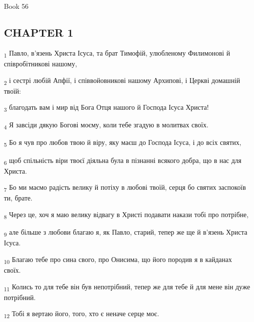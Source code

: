 Book 56
\subsection{CHAPTER 1}
\begin{tcolorbox}
\textsubscript{1} Павло, в'язень Христа Ісуса, та брат Тимофій, улюбленому Филимонові й співробітникові нашому,
\end{tcolorbox}
\begin{tcolorbox}
\textsubscript{2} і сестрі любій Апфії, і співвойовникові нашому Архипові, і Церкві домашній твоїй:
\end{tcolorbox}
\begin{tcolorbox}
\textsubscript{3} благодать вам і мир від Бога Отця нашого й Господа Ісуса Христа!
\end{tcolorbox}
\begin{tcolorbox}
\textsubscript{4} Я завсіди дякую Богові моєму, коли тебе згадую в молитвах своїх.
\end{tcolorbox}
\begin{tcolorbox}
\textsubscript{5} Бо я чув про любов твою й віру, яку маєш до Господа Ісуса, і до всіх святих,
\end{tcolorbox}
\begin{tcolorbox}
\textsubscript{6} щоб спільність віри твоєї діяльна була в пізнанні всякого добра, що в нас для Христа.
\end{tcolorbox}
\begin{tcolorbox}
\textsubscript{7} Бо ми маємо радість велику й потіху в любові твоїй, серця бо святих заспокоїв ти, брате.
\end{tcolorbox}
\begin{tcolorbox}
\textsubscript{8} Через це, хоч я маю велику відвагу в Христі подавати накази тобі про потрібне,
\end{tcolorbox}
\begin{tcolorbox}
\textsubscript{9} але більше з любови благаю я, як Павло, старий, тепер же ще й в'язень Христа Ісуса.
\end{tcolorbox}
\begin{tcolorbox}
\textsubscript{10} Благаю тебе про сина свого, про Онисима, що його породив я в кайданах своїх.
\end{tcolorbox}
\begin{tcolorbox}
\textsubscript{11} Колись то для тебе він був непотрібний, тепер же для тебе й для мене він дуже потрібний.
\end{tcolorbox}
\begin{tcolorbox}
\textsubscript{12} Тобі я вертаю його, того, хто є неначе серце моє.
\end{tcolorbox}
